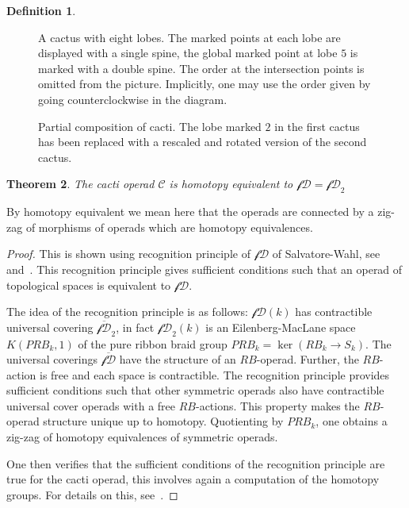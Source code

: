 \documentclass{scrartcl}
\theoremstyle{plain}
\newtheorem{theorem}{Theorem}[section]
\theoremstyle{definition}
\newtheorem{definition}[theorem]{Definition}
\begin{document}
\begin{definition}
    \begin{figure}[ht!]
        \centering
        \centering
        
        \caption{A cactus with eight lobes. The marked points at each lobe are displayed with a single spine, the global marked point at lobe $5$ is marked with a double spine. The order at the intersection points is omitted from the picture. Implicitly, one may use the order given by going counterclockwise in the diagram. }\label{cactus}
    \end{figure}
    \begin{figure}[ht!]
        \centering
        
        \caption{Partial composition of cacti. The lobe marked $2$ in the first cactus has been replaced with a rescaled and rotated version of the second cactus. }\label{cactus-composition}
    \end{figure}
\end{definition}

\begin{theorem}
    The cacti operad $\mathcal C$ is homotopy equivalent to $\mathcal {fD} = \mathcal {fD}_2$
\end{theorem}
By homotopy equivalent we mean here that the operads are connected by a zig-zag of morphisms of operads which are homotopy equivalences. 
\begin{proof}
    This is shown using recognition principle of $\mathcal{fD}$ of Salvatore-Wahl, see~\cite[2.2]{cohen2006string} and~\cite{salvatore2003framed}. This recognition principle gives sufficient conditions such that an operad of topological spaces is equivalent to $\mathcal{fD}$. 
    
    The idea of the recognition principle is as follows:     $\mathcal{fD}(k)$ has contractible universal covering $\overline {\mathcal{fD}}_2$, in fact $\mathcal{fD}_2(k)$ is an Eilenberg-MacLane space $K(PRB_k, 1)$ of the pure ribbon braid group $PRB_k = \ker(RB_k \to S_k)$. 
    The universal coverings $\overline {\mathcal{fD}}$ have the structure of an $RB$-operad. Further, the $RB$-action is free and each space is contractible. The recognition principle provides sufficient conditions such that other symmetric operads also have contractible universal cover operads with a free $RB$-actions. This property makes the $RB$-operad structure unique up to homotopy. Quotienting by $PRB_k$, one obtains a zig-zag of homotopy equivalences of symmetric operads. 

    One then verifies that the sufficient conditions of the recognition principle are true for the cacti operad, this involves again a computation of the homotopy groups. For details on this, see~\cite[2.2]{cohen2006string}.
\end{proof}
\end{document}
